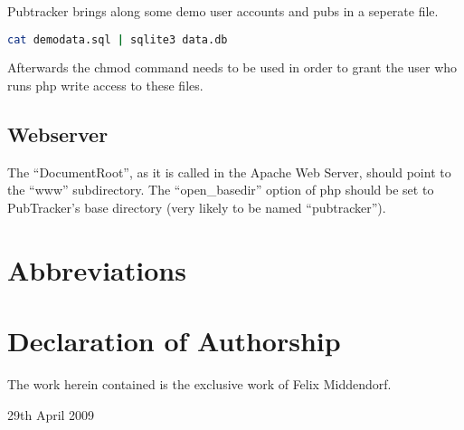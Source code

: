 \documentclass[a4paper,10pt]{scrartcl}
\begin{document}
Pubtracker brings along some demo user accounts and pubs in a seperate file.

\begin{lstlisting}[language=bash]
cat demodata.sql | sqlite3 data.db
\end{lstlisting}

Afterwards the chmod command needs to be used in order to grant the user who
runs php write access to these files.

\subsection{Webserver}
The ``DocumentRoot'', as it is called in the Apache Web Server, should point to
the ``www'' subdirectory. The ``open\_basedir'' option of php should be set to
PubTracker's base directory (very likely to be named ``pubtracker'').

\appendix
\clearpage
{}
{}



\section{Abbreviations}
\begin{acronym}[XHTML-MP]
\end{acronym}

\section{Declaration of Authorship}
The work herein contained is the exclusive work of Felix Middendorf.

29th April 2009
\end{document}
